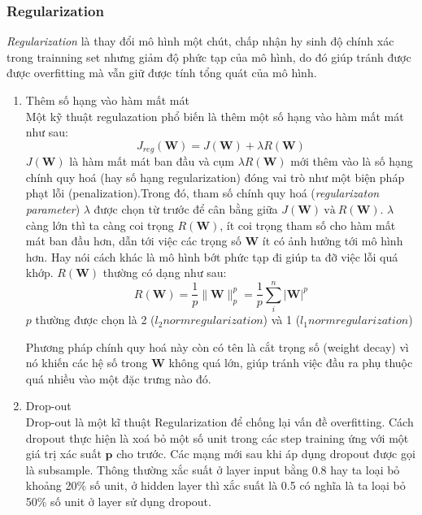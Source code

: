 \subsubsection{Regularization}
\hspace{5mm} \textit{Regularization} là thay đổi mô hình một chút, chấp nhận hy sinh độ chính xác trong trainning set nhưng giảm độ phức tạp của mô hình, do đó giúp tránh được được overfitting mà vẫn giữ được tính tổng quát của mô hình.
\begin{enumerate}
\item Thêm số hạng vào hàm mất mát\\
\hspace{5mm} Một kỹ thuật regulazation phổ biến là thêm một số hạng vào hàm mất mát như sau:
\begin{equation}
	J_{reg}(\textbf{W}) = J(\textbf{W})+ \lambda R(\textbf{W})
\end{equation}
$J(\textbf{W})$ là hàm mất mát ban đầu và cụm $ \lambda R(\textbf{W})$  mới thêm vào là số hạng chính quy hoá (hay số hạng regularization) đóng vai trò như một biện pháp phạt lỗi (penalization).Trong đó, tham số chính quy hoá (\textit{regularizaton parameter}) $\lambda$ được chọn từ trước để cân bằng giữa $J(\textbf{W}) ~\text{và}~ R(\textbf{W})$. $\lambda$ càng lớn thì ta càng coi trọng $R(\textbf{W})$, ít coi trọng tham số cho hàm mất mát ban đầu hơn, dẫn tới việc các trọng số $\textbf{W}$ ít có ảnh hưởng tới mô hình hơn. Hay nói cách khác là mô hình bớt phức tạp đi giúp ta đỡ việc lỗi quá khớp.
$R(\textbf{W})$ thường có dạng như sau:
\begin{equation}
R(\textbf{W})= \frac{1}{p}\|\textbf{W}\|^p_p = \frac{1}{p}\sum^{n}_i |\textbf{W}|^p
\end{equation}
$p$ thường được chọn là 2 (\textit{$l_2 norm regularization$}) và 1 (\textit{$l_1 norm regularization$})\par
\hspace{5mm} Phương pháp chính quy hoá này còn có tên là cắt trọng số (weight decay) vì nó khiến các hệ số trong $\textbf{W}$ không quá lớn, giúp tránh việc đầu ra phụ thuộc quá nhiều vào một đặc trưng nào đó.

\item Drop-out\\
Drop-out là một kĩ thuật Regularization để chống lại vấn đề overfitting. Cách dropout thực hiện là xoá bỏ một số unit trong các step training ứng với một giá trị xác suất $\textbf{p}$ cho trước. Các mạng mới sau khi áp dụng dropout được gọi là subsample. Thông thường xắc suất ở layer input bằng 0.8 hay ta loại bỏ khoảng 20\% số unit, ở hidden layer thì xắc suất là 0.5 có nghĩa là ta loại bỏ 50\% số unit ở layer sử dụng dropout.


\end{enumerate}
